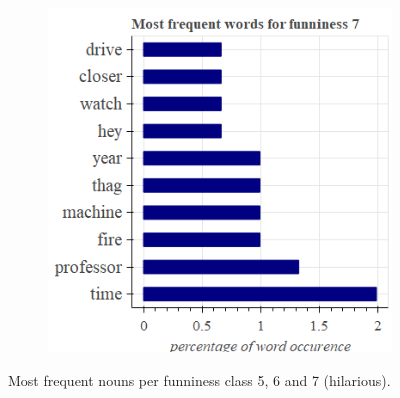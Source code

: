 \documentclass[draft,final,oneside]{vutinfth} %
\begin{document}
\begin{figure}
\begin{subfigure}[b]{0.45\textwidth}
\centering
\includegraphics[width=1.0\textwidth]{graphics/word_occurence/funniness_7}
\end{subfigure}

\caption{Most frequent nouns per funniness class 5, 6 and 7 (hilarious).}
\label{fig:wordocc2}

\end{figure}
\end{document}
